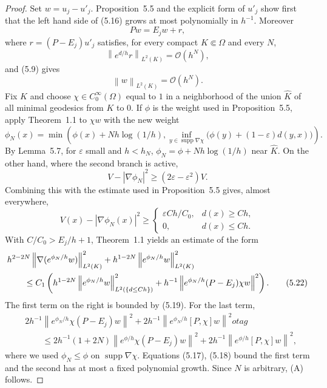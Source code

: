 \documentclass[11pt,a4paper]{article}
\newcommand{\supp}{\operatorname{supp}}
\newcommand{\cO}{\mathcal O}
\newcommand{\eps}{\varepsilon}
\newcommand{\norm}[1]{\left\lVert #1\right\rVert}
\numberwithin{equation}{section}
\theoremstyle{remark}
\begin{document}
\begin{proof}
Set $w=u_j-u'_j$. Proposition~5.5 and the explicit form of $u'_j$ show first that the left hand side of (5.16) grows at most polynomially in $h^{-1}$. Moreover
\begin{equation}
Pw=E_jw+r,
\tag{5.17}
\end{equation}
where $r=(P-E_j)u'_j$ satisfies, for every compact $K\Subset\Omega$ and every $N$,
\begin{equation}
\norm{e^{d/h}r}_{L^2(K)}=\cO(h^N),
\tag{5.18}
\end{equation}
and (5.9) gives
\begin{equation}
\norm{w}_{L^2(K)}=\cO(h^N).
\tag{5.19}
\end{equation}
Fix $K$ and choose $\chi\in C_0^\infty(\Omega)$ equal to $1$ in a neighborhood of the union $\widehat K$ of all minimal geodesics from $K$ to $0$. If $\phi$ is the weight used in Proposition~5.5, apply Theorem~1.1 to $\chi w$ with the new weight
\begin{equation}
\phi_N(x)=\min\left(
\phi(x)+Nh\log(1/h),
\inf_{y\in\supp\nabla\chi}\bigl(\phi(y)+(1-\eps)d(y,x)\bigr)
\right).
\tag{5.20}
\end{equation}
By Lemma~5.7, for $\eps$ small and $h<h_N$, $\phi_N=\phi+Nh\log(1/h)$ near $\widehat K$. On the other hand, where the second branch is active,
\[
V-|\nabla\phi_N|^2\ge(2\eps-\eps^2)V.
\]
Combining this with the estimate used in Proposition~5.5 gives, almost everywhere,
\begin{equation}
V(x)-|\nabla\phi_N(x)|^2\ge
\begin{cases}
\eps Ch/C_0,& d(x)\ge Ch,\\
0,&d(x)\le Ch.
\end{cases}
\tag{5.21}
\end{equation}
With $C/C_0>E_j/h+1$, Theorem~1.1 yields an estimate of the form
\begin{align}
&h^{2-2N}\norm{\nabla(e^{\phi_N/h}w)}_{L^2(K)}^2
+h^{1-2N}\norm{e^{\phi_N/h}w}_{L^2(K)}^2 \notag\\
&\qquad\le C_1\left(
 h^{1-2N}\norm{e^{\phi_N/h}w}_{L^2(\{d\le Ch\})}^2
 +h^{-1}\norm{e^{\phi_N/h}(P-E_j)\chi w}^2
\right).
\tag{5.22}
\end{align}
The first term on the right is bounded by (5.19). For the last term,
\begin{align}
&2h^{-1}\norm{e^{\phi_N/h}\chi(P-E_j)w}^2
+2h^{-1}\norm{e^{\phi_N/h}[P,\chi]w}^2 
otag\\
&\qquad\le
2h^{-1}(1+2N)\norm{e^{\phi/h}\chi(P-E_j)w}^2
+2h^{-1}\norm{e^{\phi/h}[P,\chi]w}^2,
\tag{5.23}
\end{align}
where we used $\phi_N\le\phi$ on $\supp\nabla\chi$. Equations (5.17), (5.18) bound the first term and the second has at most a fixed polynomial growth. Since $N$ is arbitrary, (A) follows.


\end{proof}
\end{document}
